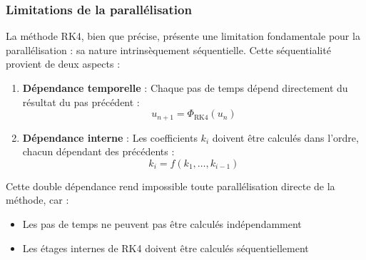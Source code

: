             
            
            
    
    \subsubsection{Limitations de la parallélisation}
    La méthode RK4, bien que précise, présente une limitation fondamentale pour la parallélisation : sa nature intrinsèquement séquentielle. Cette séquentialité provient de deux aspects :
    
    \begin{enumerate}
        \item \textbf{Dépendance temporelle} : Chaque pas de temps dépend directement du résultat du pas précédent :
        \begin{equation}
        u_{n+1} = \Phi_{\text{RK4}}(u_n)
        \end{equation}
        
        \item \textbf{Dépendance interne} : Les coefficients $k_i$ doivent être calculés dans l'ordre, chacun dépendant des précédents :
        \begin{equation}
        k_i = f(k_1, \ldots, k_{i-1})
        \end{equation}
    \end{enumerate}
    
    Cette double dépendance rend impossible toute parallélisation directe de la méthode, car :
    \begin{itemize}
        \item Les pas de temps ne peuvent pas être calculés indépendamment
        \item Les étages internes de RK4 doivent être calculés séquentiellement
    \end{itemize}
    

